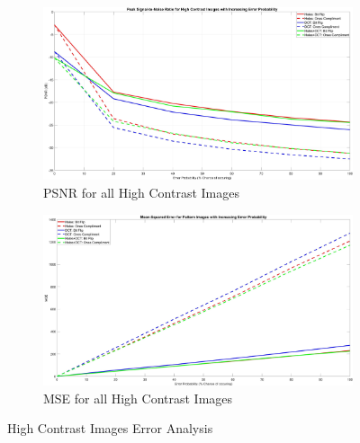 \documentclass[landscape,a0paper,fontscale=0.5]{baposter} %
\begin{document}
\begin{poster}
{\vspace{-1em}
\begin{figure}[H]
\centering
	\begin{subfigure}{0.4\textwidth} %
		\includegraphics[scale=0.09]{PSNRHigh}
		\caption{PSNR for all High Contrast Images} %
	\end{subfigure}
	\vspace{1em} %
	\begin{subfigure}{0.4\textwidth} %
		\includegraphics[scale=0.09]{MSEPattern}
		\caption{MSE for all High Contrast Images} %
	\end{subfigure}
	\vspace{-2em}
	\caption{High Contrast Images Error Analysis}
	\label{fig: High Contrast Error} %
\end{figure}

	
}






\end{poster}
\end{document}
